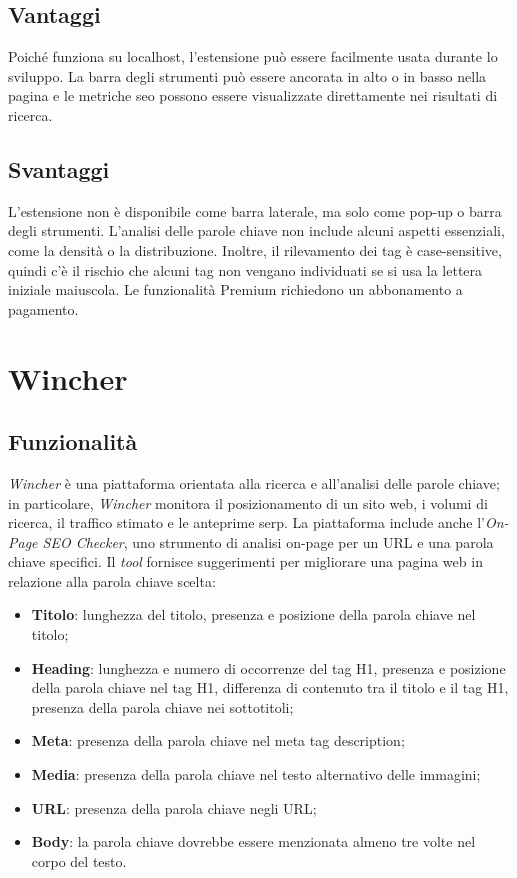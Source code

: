 \subsection{Vantaggi}
\par Poiché funziona su \gls{localhost}, l'estensione può essere facilmente usata durante lo sviluppo. La barra degli strumenti può essere ancorata in alto o in basso nella pagina e le metriche \gls{seo} possono essere visualizzate direttamente nei risultati di ricerca.

\subsection{Svantaggi}
\par L'estensione non è disponibile come barra laterale, ma solo come pop-up o barra degli strumenti. L'analisi delle parole chiave non include alcuni aspetti essenziali, come la densità o la distribuzione. Inoltre, il rilevamento dei tag è \gls{case-sensitive}, quindi c'è il rischio che alcuni tag non vengano individuati se si usa la lettera iniziale maiuscola. Le funzionalità Premium richiedono un abbonamento a pagamento. 

\section{Wincher}

\subsection{Funzionalità}
\par \textit{Wincher} è una piattaforma orientata alla ricerca e all'analisi delle parole chiave; in particolare, \textit{Wincher} monitora il posizionamento di un sito web, i volumi di ricerca, il traffico stimato e le anteprime \gls{serp}. La piattaforma include anche l'\textit{On-Page SEO Checker}, uno strumento di analisi \gls{on-page} per un URL e una parola chiave specifici. Il \textit{tool} fornisce suggerimenti per migliorare una pagina web in relazione alla parola chiave scelta:
\begin{itemize}
    \item \textbf{Titolo}: lunghezza del titolo, presenza e posizione della parola chiave nel titolo;
    \item \textbf{Heading}: lunghezza e numero di occorrenze del tag H1, presenza e posizione della parola chiave nel tag H1, differenza di contenuto tra il titolo e il tag H1, presenza della parola chiave nei sottotitoli;
    \item \textbf{Meta}: presenza della parola chiave nel meta tag description;
    \item \textbf{Media}: presenza della parola chiave nel testo alternativo delle immagini;
    \item \textbf{URL}: presenza della parola chiave negli URL;
    \item \textbf{Body}: la parola chiave dovrebbe essere menzionata almeno tre volte nel corpo del testo.
\end{itemize}

